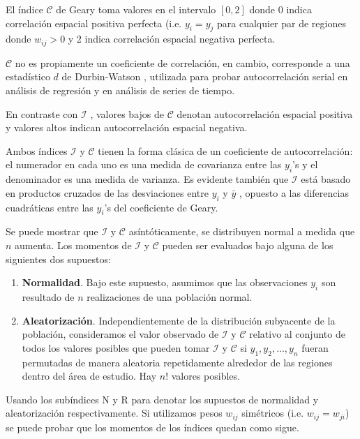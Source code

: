 El índice $\mathcal{C}$ de Geary toma valores en el intervalo $[0,2]$ donde 0 indica correlación espacial positiva perfecta (i.e. $y_{i}=y_{j}$ para cualquier par de regiones donde $w_{ij}>0$ y 2 indica correlación espacial negativa perfecta. 

$\mathcal{C}$ no es propiamente un coeficiente de correlación, en cambio, corresponde a una estadístico $d$ de Durbin-Watson \citep{clifford1981}, utilizada para probar autocorrelación serial en análisis de regresión y en análisis de series de tiempo.

En contraste con $\mathcal{I}$ , valores bajos de $\mathcal{C}$ denotan autocorrelación espacial positiva y valores altos indican autocorrelación espacial negativa.


Ambos índices $\mathcal{I}$ y $\mathcal{C}$ tienen la forma clásica de un coeficiente de autocorrelación: el numerador en cada uno es una medida de covarianza entre las $y_i$'s y el denominador es una medida de varianza. Es evidente también que $\mathcal{I}$  está basado en productos cruzados de las desviaciones entre $y_i$ y $\bar{y}$ , opuesto a las diferencias cuadráticas entre las $y_i$'s del coeficiente de Geary.

Se puede mostrar \citep[Capítulo 2]{clifford1973} que  $\mathcal{I}$ y $\mathcal{C}$ asíntóticamente, se distribuyen normal a medida que $n$ aumenta. Los momentos de $\mathcal{I}$ y $\mathcal{C}$ pueden ser evaluados bajo alguna de los siguientes dos supuestos:

\begin{enumerate}
\item \textbf{Normalidad}. Bajo este supuesto, asumimos que las observaciones $y_i$ son resultado de $n$ realizaciones de una población normal.
\item \textbf{Aleatorización}. Independientemente de la distribución subyacente de la población, consideramos el valor observado de $\mathcal{I}$ y $\mathcal{C}$ relativo al conjunto de todos los valores posibles que pueden tomar $\mathcal{I}$ y $\mathcal{C}$ si $y_1, y_2, ..., y_n$ fueran permutadas de manera aleatoria repetidamente alrededor de las regiones dentro del área de estudio. Hay $n!$ valores posibles.
\end{enumerate}

Usando los subíndices N y R para denotar los supuestos de normalidad y aleatorización respectivamente. Si utilizamos pesos $w_{ij}$ simétricos (i.e. $w_{ij}=w_{ji}$) se puede probar que los momentos de los índices quedan como sigue.

